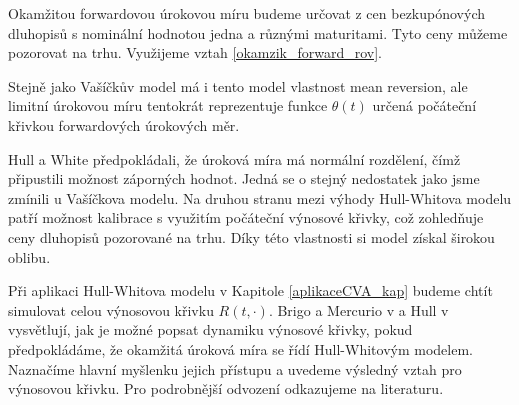 \documentclass[a4paper,12pt]{report}
\theoremstyle{definition} \newtheorem{definice}[veta]{Definice}
\theoremstyle{remark}
\begin{document}
Okamžitou forwardovou úrokovou míru budeme určovat z cen bezkupónových dluhopisů s nominální hodnotou jedna a různými maturitami. 
Tyto ceny můžeme pozorovat na trhu.
Využijeme vztah
\eqref{okamzik_forward_rov}.

Stejně jako Vašíčkův model má i tento model vlastnost mean reversion, ale limitní úrokovou míru tentokrát reprezentuje funkce $\theta(t)$ určená počáteční křivkou forwardových úrokových měr.%

Hull a White předpokládali, že úroková míra má normální rozdělení, čímž připustili možnost záporných hodnot.
Jedná se o stejný nedostatek jako jsme zmínili u Vašíčkova modelu.
Na druhou stranu mezi výhody Hull-Whitova modelu patří možnost kalibrace s využitím počáteční výnosové křivky, což zohledňuje ceny dluhopisů pozorované na trhu.
Díky této vlastnosti si model získal širokou oblibu.

Při aplikaci Hull-Whitova modelu v Kapitole \ref{aplikaceCVA_kap} budeme chtít simulovat celou výnosovou křivku $R(t,\cdot)$.
Brigo a Mercurio v \cite{brigo2007interest} a Hull v \cite{hull} vysvětlují, jak je možné popsat dynamiku výnosové křivky, pokud předpokládáme, že okamžitá úroková míra se řídí Hull-Whitovým modelem.
Naznačíme hlavní myšlenku jejich přístupu a uvedeme výsledný vztah pro výnosovou křivku.
Pro podrobnější odvození odkazujeme na literaturu. 
\end{document}
